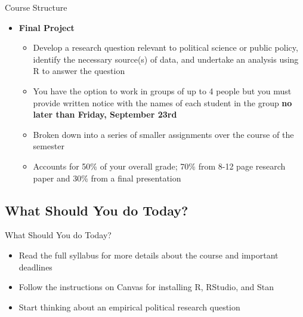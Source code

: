\documentclass[12pt,ignorenonframetext,aspectratio=169]{beamer}
\begin{document}
\begin{frame}{Course Structure}
\protect\hypertarget{course-structure-2}{}
\begin{itemize}[<+->]
\item
  \textbf{Final Project}

  \begin{itemize}[<+->]
  \item
    Develop a research question relevant to political science or public
    policy, identify the necessary source(s) of data, and undertake an
    analysis using R to answer the question
  \item
    You have the option to work in groups of up to 4 people but you must
    provide written notice with the names of each student in the group
    \textbf{no later than Friday, September 23rd}
  \item
    Broken down into a series of smaller assignments over the course of
    the semester
  \item
    Accounts for 50\% of your overall grade; 70\% from 8-12 page
    research paper and 30\% from a final presentation
  \end{itemize}
\end{itemize}
\end{frame}

\hypertarget{what-should-you-do-today}{%
\subsection{What Should You do Today?}\label{what-should-you-do-today}}

\begin{frame}{What Should You do Today?}
\begin{itemize}[<+->]
\item
  Read the full syllabus for more details about the course and important
  deadlines
\item
  Follow the instructions on Canvas for installing R, RStudio, and Stan
\item
  Start thinking about an empirical political research question
\end{itemize}
\end{frame}
\end{document}
